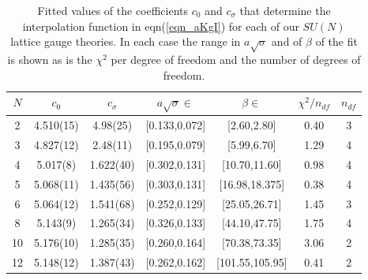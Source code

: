 \documentclass[12pt]{article}
\begin{document}
\begin{table}
\begin{center}
\begin{tabular}{|c|c|c|c|c|c|c|}\hline 
$N$ &  $c_0$ & $c_{\sigma}$ & $a\sqrt{\sigma}\in$ & $\beta\in$ & $\chi^2/n_{df}$ & $n_{df}$ \\ \hline
2  & 4.510(15)  & 4.98(25)  & [0.133,0.072] & [2.60,2.80]   &  0.40 & 3   \\
3  & 4.827(12)  & 2.48(11)  & [0.195,0.079] & [5.99,6.70]   &  1.29 & 4 \\
4  & 5.017(8)   & 1.622(40) & [0.302,0.131] & [10.70,11.60] &  0.98 & 4  \\ 
5  & 5.068(11)  & 1.435(56) & [0.303,0.131] & [16.98,18.375] & 0.38 & 4  \\ 
6  & 5.064(12)  & 1.541(68) & [0.252,0.129] & [25.05,26.71]  & 1.45 & 3  \\ 
8  & 5.143(9)   & 1.265(34) & [0.326,0.133] & [44.10,47.75]  & 1.75 & 4  \\
10 & 5.176(10)  & 1.285(35) & [0.260,0.164] & [70.38,73.35]  & 3.06 & 2   \\
12 & 5.148(12)  & 1.387(43) & [0.262,0.162] & [101.55,105.95] & 0.41 & 2  \\  \hline
\end{tabular}
\caption{Fitted values of the coefficients $c_{0}$ and  $c_{\sigma}$ that
  determine the interpolation function in eqn(\ref{eqn_aKgI}) for each of our $SU(N)$
  lattice gauge theories. In each case the range in $a\surd\sigma$ and of $\beta$ of
  the fit is shown as is the $\chi^2$ per degree of freedom and the number
  of degrees of freedom.}
\label{table_interp_gI}
\end{center}
\end{table}
\end{document}
